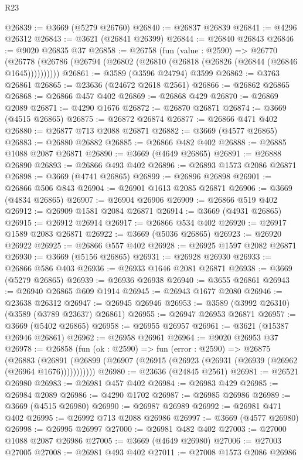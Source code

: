 \begin{lexlean}{R23}
\begin{coremodule}
@26839 := @3669 (@5279 @26760)
@26840 := @26837 @26839
@26841 := @4296 @26312
@26843 := @3621 (@26841 @26399)
@26844 := @26840 @26843
@26846 := @9020 @26835 @37
@26858 := @26758
    (fun (value : @2590) =>
    @26770 (@26778 (@26786 (@26794 (@26802 (@26810 (@26818 (@26826 (@26844 (@26846 @1645))))))))))
@26861 := @3589 (@3596 @24794) @3599
@26862 := @3763 @26861
@26865 := @23636 (@24672 @2618 @2561)
@26866 := @26862 @26865
@26868 := @26866 @457 @402
@26869 := @26868 @429
@26870 := @26869 @2089
@26871 := @4290 @1676
@26872 := @26870 @26871
@26874 := @3669 (@4515 @26865)
@26875 := @26872 @26874
@26877 := @26866 @471 @402
@26880 := @26877 @713 @2088 @26871
@26882 := @3669 (@4577 @26865)
@26883 := @26880 @26882
@26885 := @26866 @482 @402
@26888 := @26885 @1088 @2087 @26871
@26890 := @3669 (@4649 @26865)
@26891 := @26888 @26890
@26893 := @26866 @493 @402
@26896 := @26893 @1573 @2086 @26871
@26898 := @3669 (@4741 @26865)
@26899 := @26896 @26898
@26901 := @26866 @506 @843
@26904 := @26901 @1613 @2085 @26871
@26906 := @3669 (@4834 @26865)
@26907 := @26904 @26906
@26909 := @26866 @519 @402
@26912 := @26909 @1581 @2084 @26871
@26914 := @3669 (@4931 @26865)
@26915 := @26912 @26914
@26917 := @26866 @534 @402
@26920 := @26917 @1589 @2083 @26871
@26922 := @3669 (@5036 @26865)
@26923 := @26920 @26922
@26925 := @26866 @557 @402
@26928 := @26925 @1597 @2082 @26871
@26930 := @3669 (@5156 @26865)
@26931 := @26928 @26930
@26933 := @26866 @586 @403
@26936 := @26933 @1646 @2081 @26871
@26938 := @3669 (@5279 @26865)
@26939 := @26936 @26938
@26940 := @3655 @26861
@26943 := @26940 @26865 @609 @1914
@26945 := @26943 @1677 @2080
@26946 := @23638 @26312
@26947 := @26945 @26946
@26953 := @3589 (@3992 @26310) (@3589 (@3789 @23637) @26861)
@26955 := @26947 @26953 @26871
@26957 := @3669 (@5402 @26865)
@26958 := @26955 @26957
@26961 := @3621 (@15387 @26946 @26861)
@26962 := @26958 @26961
@26964 := @9020 @26953 @37
@26978 := @26858
    (fun (ok : @2590) =>
    fun (error : @2590) =>
    @26875
      (@26883
        (@26891 (@26899 (@26907 (@26915 (@26923 (@26931 (@26939 (@26962 (@26964 @1676)))))))))))
@26980 := @23636 (@24845 @2561)
@26981 := @26521 @26980
@26983 := @26981 @457 @402
@26984 := @26983 @429
@26985 := @26984 @2089
@26986 := @4290 @1702
@26987 := @26985 @26986
@26989 := @3669 (@4515 @26980)
@26990 := @26987 @26989
@26992 := @26981 @471 @402
@26995 := @26992 @713 @2088 @26986
@26997 := @3669 (@4577 @26980)
@26998 := @26995 @26997
@27000 := @26981 @482 @402
@27003 := @27000 @1088 @2087 @26986
@27005 := @3669 (@4649 @26980)
@27006 := @27003 @27005
@27008 := @26981 @493 @402
@27011 := @27008 @1573 @2086 @26986

\end{coremodule}
\end{lexlean}
